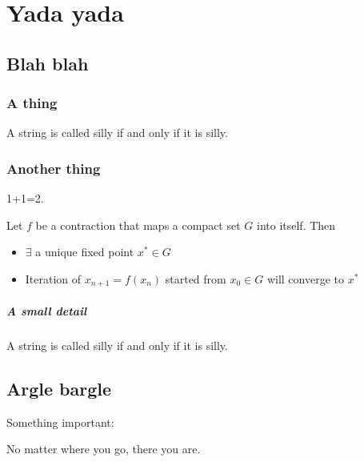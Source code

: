 \documentclass[USLetter,11pt]{report}
\begin{document}
\chapter{Yada yada}

\section{Blah blah}

\lipsum[1]
\subsection{A thing}
\lipsum[2]

\begin{defn}[Silliness]
A string is called silly if and only if it is silly.
\end{defn}

\lipsum[10]

\subsection{Another thing}
\lipsum[9]

\begin{thm}
 1+1=2.
\end{thm}

\lipsum[8]

\begin{thm}[Banach] Let $f$ be a contraction that maps a compact set $G$ into itself. Then
    \begin{itemize}
        \item $\exists$ a unique fixed point $x^*\in G$
        \item Iteration of $x_{n+1}=f(x_n)$ started from $x_0\in G$ will converge to $x^*$
    \end{itemize}
\end{thm}

\paragraph{A small detail}

\lipsum[3]

\begin{defn}[Silliness]
A string is called silly if and only if it is silly.
\end{defn}

\section{Argle bargle}
Something important:
\begin{boxedimportant}
    No matter where you go, there you are.
\end{boxedimportant}
\end{document}
